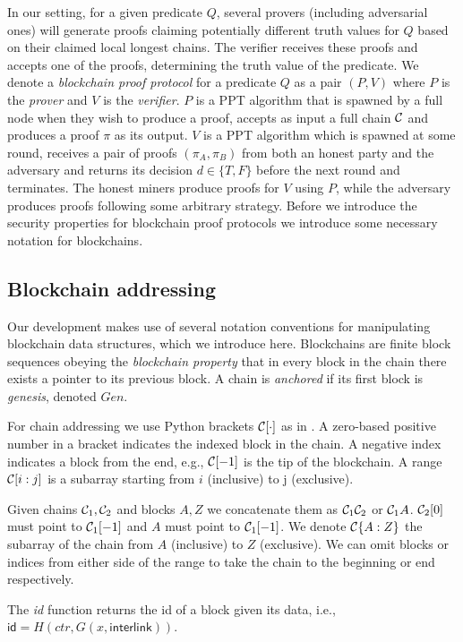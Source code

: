 In our setting, for a given predicate $Q$, several  provers (including
adversarial ones) will generate proofs claiming potentially different truth
values for $Q$ based on their claimed local longest chains. The verifier
receives these proofs and accepts one of the proofs, determining the truth value
of the predicate.  We denote a  \textit{blockchain proof protocol} for a
predicate $Q$ as a pair $(P, V)$ where $P$ is the \textit{prover} and $V$ is the
\textit{verifier}. $P$ is a PPT algorithm that is spawned by a full node when
they wish to produce a proof, accepts as input a full chain $\mathcal{C}$ and
produces a proof $\pi$ as its output. $V$ is a PPT algorithm which is spawned at
some round, receives a pair of proofs $(\pi_A, \pi_B)$ from both an honest party
and the adversary and returns its decision $d \in \{T, F\}$ before the
next round and terminates. The honest miners produce proofs for $V$ using $P$,
while the adversary produces proofs following some arbitrary strategy. Before we
introduce the security properties for blockchain proof protocols we introduce
some necessary notation for blockchains.

\subsection{Blockchain addressing}
Our development makes use of several notation conventions for manipulating
blockchain data structures, which we introduce here. Blockchains are finite
block sequences obeying the \textit{blockchain property} that in every block in
the chain there exists a pointer to its previous block. A chain is
\textit{anchored} if its first block is \textit{genesis}, denoted $Gen$.

For chain addressing we use Python brackets $\mathcal{C}[\cdot]$ as in
\cite{fruitchains}. A zero-based positive number in a bracket indicates the
indexed block in the chain. A negative index indicates a block from the end,
e.g., $\mathcal{C}[-1]$ is the tip of the blockchain. A range $\mathcal{C}[i:j]$ is a
subarray starting from $i$ (inclusive) to j (exclusive).

Given chains $\mathcal{C}_1, \mathcal{C}_2$ and blocks $A, Z$ we concatenate them as
$\mathcal{C}_1 \mathcal{C}_2$ or $\mathcal{C}_1 A$. $\mathcal{C}_2[0]$ must point to $\mathcal{C}_1[-1]$
and $A$ must point to $\mathcal{C}_1[-1]$. We denote $\mathcal{C}\{A:Z\}$ the subarray of
the chain from $A$ (inclusive) to $Z$ (exclusive). We can omit blocks or indices
from either side of the range to take the chain to the beginning or end
respectively.

The \textit{id} function
returns the id of a block given its data, i.e., $\textsf{id} = H(ctr, G(x,
\textsf{interlink}))$.
